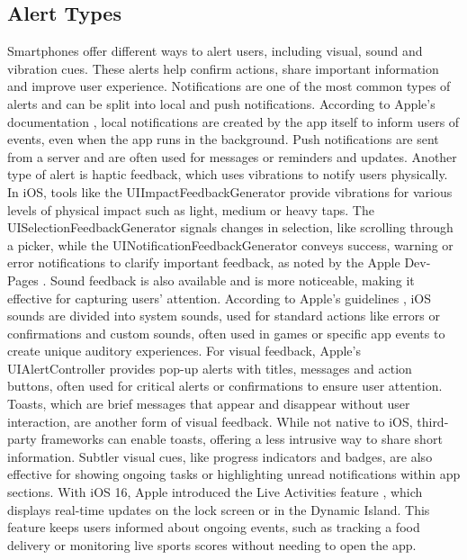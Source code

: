 \subsection{Alert Types}
Smartphones offer different ways to alert users, including visual, sound and vibration cues. 
These alerts help confirm actions, share important information and improve user experience.
Notifications are one of the most common types of alerts and can be split into local and push notifications. 
According to Apple's documentation \cite{apple_local_notifications}\cite{apple_push_notifications}, local notifications are created by the app itself to inform users of events, even when the app runs in the background. 
Push notifications are sent from a server and are often used for messages or reminders and updates.
Another type of alert is haptic feedback, which uses vibrations to notify users physically. 
In iOS, tools like the UIImpactFeedbackGenerator provide vibrations for various levels of physical impact such as light, medium or heavy taps.
The UISelectionFeedbackGenerator signals changes in selection, like scrolling through a picker, while the UINotificationFeedbackGenerator conveys success, warning or error notifications to clarify important feedback, as noted by the Apple Dev-Pages \cite{apple_haptics}.
Sound feedback is also available and is more noticeable, making it effective for capturing users' attention.
According to Apple's guidelines \cite{apple_sound_guidelines}, iOS sounds are divided into system sounds, used for standard actions like errors or confirmations and custom sounds, often used in games or specific app events to create unique auditory experiences.
For visual feedback, Apple's UIAlertController \cite{apple_alerts} provides pop-up alerts with titles, messages and action buttons, often used for critical alerts or confirmations to ensure user attention. 
Toasts, which are brief messages that appear and disappear without user interaction, are another form of visual feedback. 
While not native to iOS, third-party frameworks can enable toasts, offering a less intrusive way to share short information. 
Subtler visual cues, like progress indicators and badges, are also effective for showing ongoing tasks or highlighting unread notifications within app sections.
With iOS 16, Apple introduced the Live Activities feature \cite{apple_live_activities}, which displays real-time updates on the lock screen or in the Dynamic Island. 
This feature keeps users informed about ongoing events, such as tracking a food delivery or monitoring live sports scores without needing to open the app.

